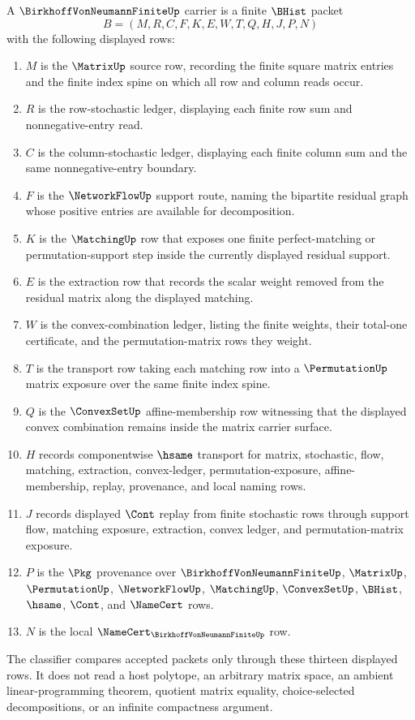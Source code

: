 \begin{definition}
\label{def:birkhoff-von-neumann-finite-carrier}
A $\BirkhoffVonNeumannFiniteUp$ carrier is a finite $\BHist$ packet
$$
B=(M,R,C,F,K,E,W,T,Q,H,J,P,N)
$$
with the following displayed rows:
\begin{enumerate}
\item $M$ is the $\MatrixUp$ source row, recording the finite square matrix entries and the finite index spine on which all row and column reads occur.
\item $R$ is the row-stochastic ledger, displaying each finite row sum and nonnegative-entry read.
\item $C$ is the column-stochastic ledger, displaying each finite column sum and the same nonnegative-entry boundary.
\item $F$ is the $\NetworkFlowUp$ support route, naming the bipartite residual graph whose positive entries are available for decomposition.
\item $K$ is the $\MatchingUp$ row that exposes one finite perfect-matching or permutation-support step inside the currently displayed residual support.
\item $E$ is the extraction row that records the scalar weight removed from the residual matrix along the displayed matching.
\item $W$ is the convex-combination ledger, listing the finite weights, their total-one certificate, and the permutation-matrix rows they weight.
\item $T$ is the transport row taking each matching row into a $\PermutationUp$ matrix exposure over the same finite index spine.
\item $Q$ is the $\ConvexSetUp$ affine-membership row witnessing that the displayed convex combination remains inside the matrix carrier surface.
\item $H$ records componentwise $\hsame$ transport for matrix, stochastic, flow, matching, extraction, convex-ledger, permutation-exposure, affine-membership, replay, provenance, and local naming rows.
\item $J$ records displayed $\Cont$ replay from finite stochastic rows through support flow, matching exposure, extraction, convex ledger, and permutation-matrix exposure.
\item $P$ is the $\Pkg$ provenance over $\BirkhoffVonNeumannFiniteUp$, $\MatrixUp$, $\PermutationUp$, $\NetworkFlowUp$, $\MatchingUp$, $\ConvexSetUp$, $\BHist$, $\hsame$, $\Cont$, and $\NameCert$ rows.
\item $N$ is the local $\NameCert_{\BirkhoffVonNeumannFiniteUp}$ row.
\end{enumerate}
The classifier compares accepted packets only through these thirteen displayed rows. It does not read a host polytope, an arbitrary matrix space, an ambient linear-programming theorem, quotient matrix equality, choice-selected decompositions, or an infinite compactness argument.
\end{definition}

